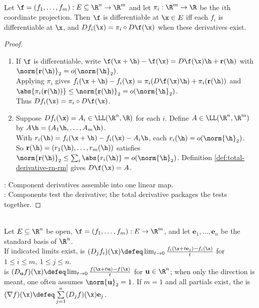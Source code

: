 \begin{theorem} \label{thm:several-variable-componentwise-differentiability} \\
Let $\f=(f_1,\ldots,f_m):E\subseteq\R^n\to\R^m$ and let $\pi_i:\R^m\to\R$ be the $i$th coordinate projection. Then $\f$ is differentiable at $\x\in E$ iff each $f_i$ is differentiable at $\x$, and $D f_i(\x)=\pi_i\circ D\f(\x)$ when these derivatives exist.
\begin{proof}
\begin{enumerate}[label=\roman*.]
\setlength{\itemsep}{0pt}
\item[$(\Rightarrow)$] If $\f$ is differentiable, write $\f(\x+\h)-\f(\x)=D\f(\x)\h+\mathbf r(\h)$ with $\norm{\mathbf r(\h)}_2=o(\norm{\h}_2)$.\\
Applying $\pi_i$ gives $f_i(\x+\h)-f_i(\x)=\pi_i(D\f(\x)\h)+\pi_i(\mathbf r(\h))$ and $\abs{\pi_i(\mathbf r(\h))}\leq\norm{\mathbf r(\h)}_2=o(\norm{\h}_2)$.\\
Thus $D f_i(\x)=\pi_i\circ D\f(\x)$.
\item[$(\Leftarrow)$] Suppose $D f_i(\x)=A_i\in\LL(\R^n,\R)$ for each $i$. Define $A\in\LL(\R^n,\R^m)$ by $A\h=(A_1\h,\ldots,A_m\h)$.\\
With $r_i(\h)=f_i(\x+\h)-f_i(\x)-A_i\h$, each $r_i(\h)=o(\norm{\h}_2)$.\\
So $\mathbf r(\h)=(r_1(\h),\ldots,r_m(\h))$ satisfies $\norm{\mathbf r(\h)}_2\leq\sum_i\abs{r_i(\h)}=o(\norm{\h}_2)$. Definition \ref{def:total-derivative-rn-rm} gives $D\f(\x)=A$.
\end{enumerate}
: Component derivatives assemble into one linear map.\\
: Components test the derivative; the total derivative packages the tests together.
\end{proof}
\end{theorem}

\begin{definition} \label{def:partials-gradient-directional-derivatives} \\
Let $E\subseteq\R^n$ be open, $\f=(f_1,\ldots,f_m):E\to\R^m$, and let $\mathbf{e}_1,\ldots,\mathbf{e}_n$ be the standard basis of $\R^n$.\\
If indicated limits exist,  is $(D_jf_i)(\x)\defeq\lim_{t\to0}\frac{f_i(\x+t\mathbf{e}_j)-f_i(\x)}{t}$ for $1\leq i\leq m,\ 1\leq j\leq n$.\\
 is $(D_{\mathbf{u}}f)(\x)\defeq\lim_{t\to0}\frac{f(\x+t\mathbf{u})-f(\x)}{t}$ for $\mathbf{u}\in\R^n$; when only the direction is meant, one often assumes $\norm{\mathbf{u}}_2=1$. If $m=1$ and all partials exist, the  is $(\nabla f)(\x)\defeq \sum\limits_{j=1}^{n}(D_jf)(\x)\mathbf{e}_j$.
\end{definition}

